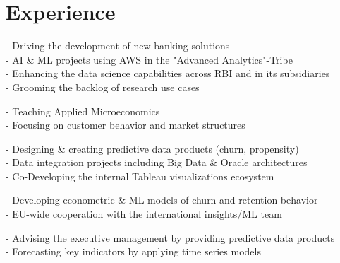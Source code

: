 \documentclass[a4paper]{twentysecondcv} %
\begin{document}

\section{Experience}

\begin{twenty} %

{\small - Driving the development of new banking solutions\\
        - AI \& ML projects using AWS in the "Advanced Analytics"-Tribe\\
        - Enhancing the data science capabilities across RBI and in its subsidiaries\\
        - Grooming the backlog of research use cases     
}


{\small - Teaching Applied Microeconomics\\
        - Focusing on customer behavior and market structures
}	


{\small - Designing \& creating predictive data products (churn, propensity)\\
        - Data integration projects including Big Data \& Oracle architectures\\
        - Co-Developing the internal Tableau visualizations ecosystem 
}

	
{\small - Developing econometric \& ML models of churn and retention behavior\\
        - EU-wide cooperation with the international insights/ML team
}
	
{\small - Advising the executive management by providing predictive data products\\
        - Forecasting key indicators by applying time series models
}
	

\end{twenty}
\end{document}
